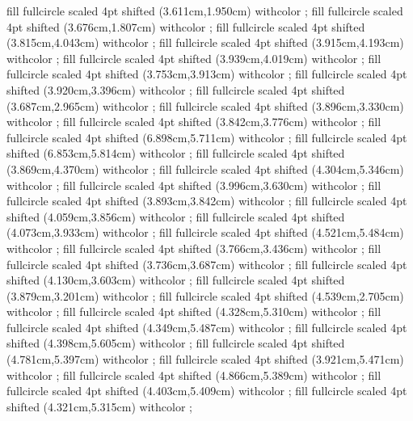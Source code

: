 {fill fullcircle scaled 4pt shifted (3.611cm,1.950cm) withcolor ;
fill fullcircle scaled 4pt shifted (3.676cm,1.807cm) withcolor ;
fill fullcircle scaled 4pt shifted (3.815cm,4.043cm) withcolor ;
fill fullcircle scaled 4pt shifted (3.915cm,4.193cm) withcolor ;
fill fullcircle scaled 4pt shifted (3.939cm,4.019cm) withcolor ;
fill fullcircle scaled 4pt shifted (3.753cm,3.913cm) withcolor ;
fill fullcircle scaled 4pt shifted (3.920cm,3.396cm) withcolor ;
fill fullcircle scaled 4pt shifted (3.687cm,2.965cm) withcolor ;
fill fullcircle scaled 4pt shifted (3.896cm,3.330cm) withcolor ;
fill fullcircle scaled 4pt shifted (3.842cm,3.776cm) withcolor ;
fill fullcircle scaled 4pt shifted (6.898cm,5.711cm) withcolor ;
fill fullcircle scaled 4pt shifted (6.853cm,5.814cm) withcolor ;
fill fullcircle scaled 4pt shifted (3.869cm,4.370cm) withcolor ;
fill fullcircle scaled 4pt shifted (4.304cm,5.346cm) withcolor ;
fill fullcircle scaled 4pt shifted (3.996cm,3.630cm) withcolor ;
fill fullcircle scaled 4pt shifted (3.893cm,3.842cm) withcolor ;
fill fullcircle scaled 4pt shifted (4.059cm,3.856cm) withcolor ;
fill fullcircle scaled 4pt shifted (4.073cm,3.933cm) withcolor ;
fill fullcircle scaled 4pt shifted (4.521cm,5.484cm) withcolor ;
fill fullcircle scaled 4pt shifted (3.766cm,3.436cm) withcolor ;
fill fullcircle scaled 4pt shifted (3.736cm,3.687cm) withcolor ;
fill fullcircle scaled 4pt shifted (4.130cm,3.603cm) withcolor ;
fill fullcircle scaled 4pt shifted (3.879cm,3.201cm) withcolor ;
fill fullcircle scaled 4pt shifted (4.539cm,2.705cm) withcolor ;
fill fullcircle scaled 4pt shifted (4.328cm,5.310cm) withcolor ;
fill fullcircle scaled 4pt shifted (4.349cm,5.487cm) withcolor ;
fill fullcircle scaled 4pt shifted (4.398cm,5.605cm) withcolor ;
fill fullcircle scaled 4pt shifted (4.781cm,5.397cm) withcolor ;
fill fullcircle scaled 4pt shifted (3.921cm,5.471cm) withcolor ;
fill fullcircle scaled 4pt shifted (4.866cm,5.389cm) withcolor ;
fill fullcircle scaled 4pt shifted (4.403cm,5.409cm) withcolor ;
fill fullcircle scaled 4pt shifted (4.321cm,5.315cm) withcolor ;
}

